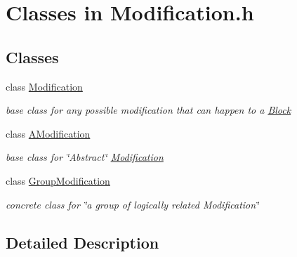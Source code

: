 \hypertarget{group___modification___c_l_a_s_s_e_s}{}\section{Classes in Modification.\+h}
\label{group___modification___c_l_a_s_s_e_s}
\subsection*{Classes}
\begin{DoxyCompactItemize}
\item 
class \mbox{\hyperlink{class_s_m_spp__di__unipi__it_1_1_modification}{Modification}}
\begin{DoxyCompactList}\small\item\em base class for any possible modification that can happen to a \mbox{\hyperlink{class_s_m_spp__di__unipi__it_1_1_block}{Block}} \end{DoxyCompactList}\item 
class \mbox{\hyperlink{class_s_m_spp__di__unipi__it_1_1_a_modification}{A\+Modification}}
\begin{DoxyCompactList}\small\item\em base class for \char`\"{}\+Abstract\char`\"{} \mbox{\hyperlink{class_s_m_spp__di__unipi__it_1_1_modification}{Modification}} \end{DoxyCompactList}\item 
class \mbox{\hyperlink{class_s_m_spp__di__unipi__it_1_1_group_modification}{Group\+Modification}}
\begin{DoxyCompactList}\small\item\em concrete class for \char`\"{}a group of logically related Modification\char`\"{} \end{DoxyCompactList}\end{DoxyCompactItemize}


\subsection{Detailed Description}
